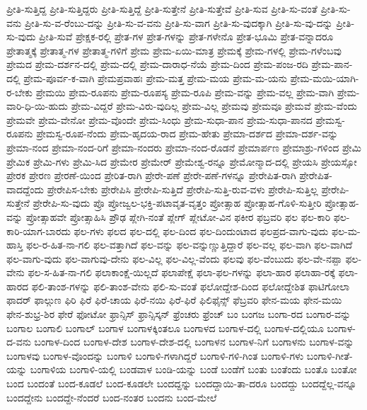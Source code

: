 {ಪ್ರೀತಿ-ಸುತ್ತಿದ್ದ
ಪ್ರೀತಿ-ಸುತ್ತಿದ್ದರು
ಪ್ರೀತಿ-ಸುತ್ತಿದ್ದೆ
ಪ್ರೀತಿ-ಸುತ್ತೇನೆ
ಪ್ರೀತಿ-ಸುತ್ತೇವೆ
ಪ್ರೀತಿ-ಸುವ
ಪ್ರೀತಿ-ಸು-ವಂತೆ
ಪ್ರೀತಿ-ಸು-ವನು
ಪ್ರೀತಿ-ಸು-ವ-ರೆಂಬು-ದನ್ನು
ಪ್ರೀತಿ-ಸು-ವ-ವನು
ಪ್ರೀತಿ-ಸು-ವಾಗ
ಪ್ರೀತಿ-ಸು-ವುದಕ್ಕಾಗಿ
ಪ್ರೀತಿ-ಸು-ವು-ದನ್ನು
ಪ್ರೀತಿ-ಸು-ವುದು
ಪ್ರೀತಿ-ಸುವೆ
ಪ್ರೇಕ್ಷಕ-ರಲ್ಲಿ
ಪ್ರೇತ-ಗಳ
ಪ್ರೇತ-ಗಳನ್ನು
ಪ್ರೇತ-ಗಳೇನೊ
ಪ್ರೇತ-ಭೂಮಿ
ಪ್ರೇತ-ವನ್ನಾದರೂ
ಪ್ರೇತಾತ್ಮಕ್ಕೆ
ಪ್ರೇತಾತ್ಮ-ಗಳ
ಪ್ರೇತಾತ್ಮ-ಗಳಿಗೆ
ಪ್ರೇಮ
ಪ್ರೇಮ-ಏಯಿ-ಮಾತ್ರ
ಪ್ರೇಮಕ್ಕೆ
ಪ್ರೇಮ-ಗಳಲ್ಲಿ
ಪ್ರೇಮ-ಗಳೆಂಬವು
ಪ್ರೇಮದ
ಪ್ರೇಮ-ದರ್ಶನ-ದಲ್ಲಿ
ಪ್ರೇಮ-ದಲ್ಲಿ
ಪ್ರೇಮ-ದಾರಾಧ-ನೆಯೆ
ಪ್ರೇಮ-ದಿಂದ
ಪ್ರೇಮ-ಪಂಜ-ರದಿ
ಪ್ರೇಮ-ಪಾನ-ದಲ್ಲಿ
ಪ್ರೇಮ-ಪೂರ್ವ-ಕ-ವಾಗಿ
ಪ್ರೇಮಪ್ರವಾಹಃ
ಪ್ರೇಮ-ಮತ್ತ
ಪ್ರೇಮ-ಮಯ
ಪ್ರೇಮ-ಮ-ಯನು
ಪ್ರೇಮ-ಮಯಿ-ಯಾಗಿ-ರ-ಬೇಕು
ಪ್ರೇಮಯಿ
ಪ್ರೇಮ-ರೂಪನು
ಪ್ರೇಮ-ರೂಪಸ್ಯ
ಪ್ರೇಮ-ರೂಪಿ
ಪ್ರೇಮ-ವನ್ನು
ಪ್ರೇಮ-ವಲ್ಲ
ಪ್ರೇಮ-ವಾಗಿ
ಪ್ರೇಮ-ವಾರಿ-ಧಿ-ಯಿ-ಹುದು
ಪ್ರೇಮ-ವಿದ್ದರೆ
ಪ್ರೇಮ-ವಿರು-ವುದಿಲ್ಲ
ಪ್ರೇಮ-ವಿಲ್ಲ
ಪ್ರೇಮವು
ಪ್ರೇಮವೂ
ಪ್ರೇಮವೆ
ಪ್ರೇಮ-ವೆಂದು
ಪ್ರೇಮವೇ
ಪ್ರೇಮ-ವೇನೋ
ಪ್ರೇಮ-ವೊಂದೇ
ಪ್ರೇಮ-ಸಿಂಧು
ಪ್ರೇಮ-ಸುಧಾ-ಪಾನ
ಪ್ರೇಮ-ಸುಧಾ-ಪಾನದ
ಪ್ರೇಮಸ್ವ-ರೂಪನು
ಪ್ರೇಮಸ್ವ-ರೂಪ-ನೆಂದು
ಪ್ರೇಮ-ಹೃದಯ-ರಾದ
ಪ್ರೇಮ-ಹೇತು
ಪ್ರೇಮಾ-ದರ್ಶದ
ಪ್ರೇಮಾ-ದರ್ಶ-ವನ್ನು
ಪ್ರೇಮಾ-ನಂದ
ಪ್ರೇಮಾ-ನಂದ-ರಿಗೆ
ಪ್ರೇಮಾ-ನಂದರು
ಪ್ರೇಮಾ-ನಂದ-ರೊಡನೆ
ಪ್ರೇಮಾರ್ಪಣ
ಪ್ರೇಮಾಶ್ರು-ಗಳಿಂದ
ಪ್ರೇಮಿ
ಪ್ರೇಮಿಕ
ಪ್ರೇಮಿ-ಗಳು
ಪ್ರೇಮಿ-ಸಿದ
ಪ್ರೇಮೇರ
ಪ್ರೇಮೇರ್
ಪ್ರೇಮೇಶ್ವ-ರನ್ನೂ
ಪ್ರೇಮೋನ್ಮಾದ-ದಲ್ಲಿ
ಪ್ರೇಯಸಿ
ಪ್ರೇಯಸ್ಸೋ
ಪ್ರೇರಕ
ಪ್ರೇರಣ
ಪ್ರೇರಣೆ-ಯಿಂದ
ಪ್ರೇರಿತ-ರಾಗಿ
ಪ್ರೇರೇ-ಪಣೆ
ಪ್ರೇರೇ-ಪಣೆ-ಗಳನ್ನೂ
ಪ್ರೇರೇಪಿತ-ರಾಗಿ
ಪ್ರೇರೇಪಿತ-ವಾದದ್ದೆಂದು
ಪ್ರೇರೇಪಿಸ-ಬೇಕು
ಪ್ರೇರೇಪಿಸಿ
ಪ್ರೇರೇಪಿ-ಸುತ್ತಿದೆ
ಪ್ರೇರೇಪಿ-ಸುತ್ತಿ-ರುವ-ವಳು
ಪ್ರೇರೇಪಿ-ಸುತ್ತಿಲ್ಲ
ಪ್ರೇರೇಪಿ-ಸುತ್ತೇನೆ
ಪ್ರೇರೇಪಿ-ಸು-ವುದು
ಪ್ರೊ
ಪ್ರೋಜ್ವಲ-ಭಕ್ತಿ-ಪಟಾವೃತ-ವೃತ್ತಂ
ಪ್ರೋತ್ಸಾಹ
ಪ್ರೋತ್ಸಾಹ-ಗೊಳಿ-ಸುತ್ತೀರಿ
ಪ್ರೋತ್ಸಾಹ-ವನ್ನು
ಪ್ರೋತ್ಸಾಹವೇ
ಪ್ರೋತ್ಸಾಹಿಸಿ
ಪ್ರೌಢ
ಪ್ಲೇಗಿ-ನಂತೆ
ಪ್ಲೇಗ್
ಪ್ಲೇಟೋ-ವಿನ
ಫಕೀರ
ಫಬ್ರವರಿ
ಫಲ
ಫಲ-ಕಾರಿ
ಫಲ-ಕಾರಿ-ಯಾಗ-ಬಾರದು
ಫಲ-ಗಳು
ಫಲದ
ಫಲ-ದಲ್ಲಿ
ಫಲ-ದಿಂದ
ಫಲ-ದಿಂದುಂಟಾದ
ಫಲಪ್ರದ-ವಾಗು-ವುದು
ಫಲ-ಮ-ಹಾಸ್ತಿ
ಫಲ-ರ-ಹಿತ-ನಾ-ಗಲಿ
ಫಲ-ವತ್ತಾಗಿದೆ
ಫಲ-ವನ್ನು
ಫಲ-ವನ್ನುಣ್ಣುತ್ತಿದ್ದಾರೆ
ಫಲ-ವಲ್ಲ
ಫಲ-ವಾಗಿ
ಫಲ-ವಾಗಿದೆ
ಫಲ-ವಾಗು-ವುದು
ಫಲ-ವಾಗುವು-ದೇನು
ಫಲ-ವಿಲ್ಲ
ಫಲ-ವಿಲ್ಲ-ವೆಂದು
ಫಲವು
ಫಲ-ವೆಂಬುದು
ಫಲ-ವೇ-ನಪ್ಪಾ
ಫಲ-ವೇನು
ಫಲ-ಸ-ಹಿತ-ನಾ-ಗಲಿ
ಫಲಾಕಾಂಕ್ಷೆ-ಯಿಲ್ಲದೆ
ಫಲಾಪೇಕ್ಷೆ
ಫಲಾ-ಫಲ-ಗಳನ್ನು
ಫಲಾ-ಹಾರ
ಫಲಾಹಾ-ರಕ್ಕೆ
ಫಲಾ-ಹಾರದ
ಫಲಿ-ತಾಂಶ-ಗಳನ್ನು
ಫಲಿ-ತಾಂಶ-ವೇನು
ಫಲಿ-ಸು-ವಂತೆ
ಫಲೋದ್ದೇಶ-ದಿಂದ
ಫಲೋದ್ದೇಶಿತ
ಫಾಟಿಗೋಲಾ
ಫಾದರ್
ಫಾಲ್ಗುಣ
ಫಿರಿ
ಫಿರೆ
ಫಿರೆ-ಚಾಯ
ಫಿರೆ-ನಯಿ
ಫಿರೆ-ಫಿರೆ
ಫಿಲಿಫೈನ್ಸ್
ಫೆಬ್ರವರಿ
ಫೇನ-ಮಯ
ಫೇನ-ಮಯಿ
ಫೇನ-ಶುಭ್ರ-ಶಿರ
ಫೇರೆ
ಫೋಟೋ
ಫ್ರಾನ್ಸಿಸ್
ಫ್ರಾನ್ಸಿಸ್ಕನ್
ಫ್ರೆಂಚರು
ಫ್ರೆಂಚ್
ಬಂ
ಬಂಗಜ
ಬಂಗಾ-ರದ
ಬಂಗಾರ-ವನ್ನು
ಬಂಗಾಲ
ಬಂಗಾಲಿ
ಬಂಗಾಲ್
ಬಂಗಾಳ
ಬಂಗಾಳಕ್ಕಿಂತಲೂ
ಬಂಗಾಳದ
ಬಂಗಾಳ-ದಲ್ಲಿ
ಬಂಗಾಳ-ದಲ್ಲಿಯೂ
ಬಂಗಾಳ-ದ-ವನು
ಬಂಗಾಳ-ದಿಂದ
ಬಂಗಾಳ-ದೇಶ
ಬಂಗಾಳ-ದೇಶ-ದಲ್ಲಿ
ಬಂಗಾಳನ
ಬಂಗಾಳ-ನಿಗೆ
ಬಂಗಾಳನು
ಬಂಗಾಳ-ವನ್ನು
ಬಂಗಾಳವು
ಬಂಗಾಳ-ವೊಂದನ್ನು
ಬಂಗಾಳಿ
ಬಂಗಾಳಿ-ಗಳಾಗಿದ್ದರೆ
ಬಂಗಾಳಿ-ಗಳಿ-ಗಿಂತ
ಬಂಗಾಳಿ-ಗಳು
ಬಂಗಾಳಿ-ಗೀತೆ-ಯನ್ನು
ಬಂಗಾಳಿಯ
ಬಂಗಾಳಿ-ಯಲ್ಲಿ
ಬಂಡವಾಳ
ಬಂಡಿ-ಯನ್ನು
ಬಂಡೆ
ಬಂಡೆಗೆ
ಬಂತು
ಬಂತೆಂದು
ಬಂತೊ
ಬಂತೋ
ಬಂದ
ಬಂದಂತೆ
ಬಂದ-ಕೂಡಲೆ
ಬಂದ-ಕೂಡಲೇ
ಬಂದದ್ದನ್ನು
ಬಂದದ್ದಾಯಿ-ತಾ-ದರೂ
ಬಂದದ್ದು
ಬಂದದ್ದೆಲ್ಲ-ವನ್ನೂ
ಬಂದದ್ದೇನು
ಬಂದದ್ದೇ-ನೆಂದರೆ
ಬಂದ-ನಂತರ
ಬಂದನು
ಬಂದ-ಮೇಲೆ
}
